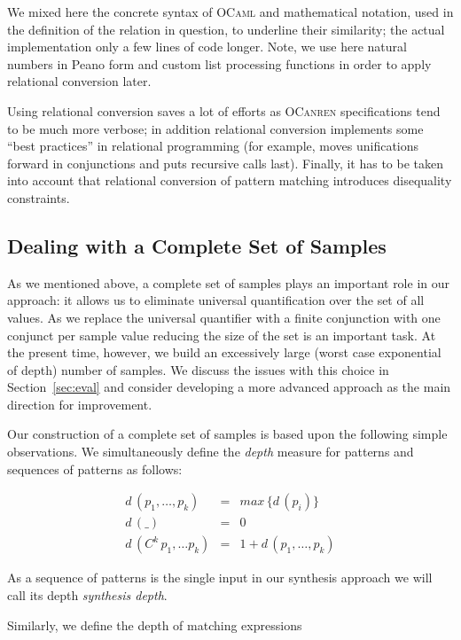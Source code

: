 We mixed here the concrete syntax of \textsc{OCaml} and mathematical notation, used in the definition of the relation in question, to underline their similarity;
the actual implementation only a few lines of code longer. Note, we use here natural numbers in Peano form and custom list processing functions in order
to apply relational conversion later.

Using relational conversion saves a lot of efforts as \textsc{OCanren} specifications tend to be much more verbose; in addition
relational conversion implements some ``best practices'' in relational programming (for example, moves unifications forward in
conjunctions and puts recursive calls last). Finally, it has to be taken into account that relational conversion of pattern matching introduces
disequality constraints.

\subsection{Dealing with a Complete Set of Samples}
\label{sec:samples}

As we mentioned above, a complete set of samples plays an important role in our approach: it allows us to eliminate universal quantification over the
set of all values. As we replace the universal quantifier with a finite conjunction with one conjunct per sample value reducing the size of
the set is an important task. At the present time, however, we build an excessively large (worst case exponential of depth) number of samples. We discuss
the issues with this choice in Section~\ref{sec:eval} and consider developing a more advanced approach as the main direction for
improvement.

Our construction of a complete set of samples is based upon the following simple observations. We simultaneously define the \emph{depth} measure
for patterns and sequences of patterns as follows:

\[
\begin{array}{rcl}
   d\,(p_1,\dots,p_k)     & = & max\, \{ d\,(p_i)\}\\
   d\,(\_)                 & = & 0 \\
   d\,(C^k\,p_1,\dots p_k) & = & 1 + d\,(p_1,\dots,p_k)
\end{array}
\]

\noindent As a sequence of patterns is the single input in our synthesis approach we will call its depth \emph{synthesis depth}.

Similarly, we define the depth of matching expressions

